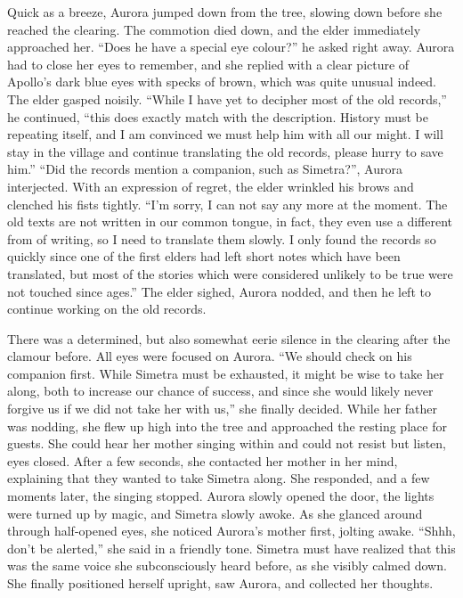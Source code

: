 Quick as a breeze, Aurora jumped down from the tree, slowing down before she reached the clearing. The commotion died down, and the elder immediately approached her. \enquote{Does he have a special eye colour?} he asked right away. Aurora had to close her eyes to remember, and she replied with a clear picture of Apollo's dark blue eyes with specks of brown, which was quite unusual indeed. The elder gasped noisily. \enquote{While I have yet to decipher most of the old records,} he continued, \enquote{this does exactly match with the description. History must be repeating itself, and I am convinced we must help him with all our might. I will stay in the village and continue translating the old records, please hurry to save him.} \enquote{Did the records mention a companion, such as Simetra?}, Aurora interjected. With an expression of regret, the elder wrinkled his brows and clenched his fists tightly. \enquote{I'm sorry, I can not say any more at the moment. The old texts are not written in our common tongue, in fact, they even use a different from of writing, so I need to translate them slowly. I only found the records so quickly since one of the first elders had left short notes which have been translated, but most of the stories which were considered unlikely to be true were not touched since ages.} The elder sighed, Aurora nodded, and then he left to continue working on the old records.

There was a determined, but also somewhat eerie silence in the clearing after the clamour before. All eyes were focused on Aurora. \enquote{We should check on his companion first. While Simetra must be exhausted, it might be wise to take her along, both to increase our chance of success, and since she would likely never forgive us if we did not take her with us,} she finally decided. While her father was nodding, she flew up high into the tree and approached the resting place for guests. She could hear her mother singing within and could not resist but listen, eyes closed. After a few seconds, she contacted her mother in her mind, explaining that they wanted to take Simetra along. She responded, and a few moments later, the singing stopped. Aurora slowly opened the door, the lights were turned up by magic, and Simetra slowly awoke. As she glanced around through half-opened eyes, she noticed Aurora's mother first, jolting awake. \enquote{Shhh, don't be alerted,} she said in a friendly tone. Simetra must have realized that this was the same voice she subconsciously heard before, as she visibly calmed down. She finally positioned herself upright, saw Aurora, and collected her thoughts.


